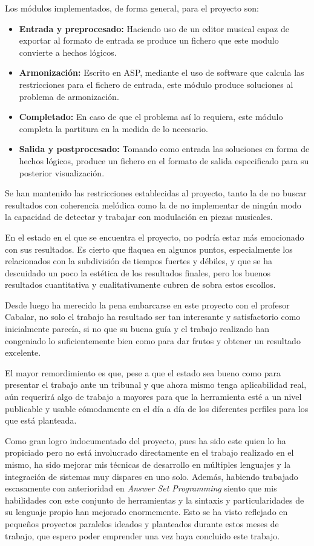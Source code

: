 Los módulos implementados, de forma general, para el proyecto son:
\begin{itemize}
	\item \textbf{Entrada y preprocesado:} Haciendo uso de un editor musical capaz de exportar al formato de entrada se produce un fichero que este modulo convierte a hechos lógicos.
	\item \textbf{Armonización:} Escrito en ASP, mediante el uso de software que calcula las restricciones para el fichero de entrada, este módulo produce soluciones al problema de armonización.
	\item \textbf{Completado:} En caso de que el problema así lo requiera, este módulo completa la partitura en la medida de lo necesario.
	\item \textbf{Salida y postprocesado:} Tomando como entrada las soluciones en forma de hechos lógicos, produce un fichero en el formato de salida especificado para su posterior visualización.
\end{itemize}

Se han mantenido las restricciones establecidas al proyecto, tanto la de no buscar resultados con coherencia melódica como la de no implementar de ningún modo la capacidad de detectar y trabajar con modulación en piezas musicales.

En el estado en el que se encuentra el proyecto, no podría estar más emocionado con sus resultados. Es cierto que flaquea en algunos puntos, especialmente los relacionados con la subdivisión de tiempos fuertes y débiles, y que se ha descuidado un poco la estética de los resultados finales, pero los buenos resultados cuantitativa y cualitativamente cubren de sobra estos escollos.
 
 Desde luego ha merecido la pena embarcarse en este proyecto con el profesor Cabalar, no solo el trabajo ha resultado ser tan interesante y satisfactorio como inicialmente parecía, si no que su buena guía y el trabajo realizado han congeniado lo suficientemente bien como para dar frutos y obtener un resultado excelente.
 
 El mayor remordimiento es que, pese a que el estado sea bueno como para presentar el trabajo ante un tribunal y que ahora mismo tenga aplicabilidad real, aún requerirá algo de trabajo a mayores para que la herramienta esté a un nivel publicable y usable cómodamente en el día a día de los diferentes perfiles para los que está planteada.
 
 Como gran logro indocumentado del proyecto, pues ha sido este quien lo ha propiciado pero no está involucrado directamente en el trabajo realizado en el mismo, ha sido mejorar mis técnicas de desarrollo en múltiples lenguajes y la integración de sistemas muy dispares en uno solo. Además, habiendo trabajado escasamente con anterioridad en \textit{Answer Set Programming} siento que mis habilidades con este conjunto de herramientas y la sintaxis y particularidades de su lenguaje propio han mejorado enormemente. Esto se ha visto reflejado en pequeños proyectos paralelos ideados y planteados durante estos meses de trabajo, que espero poder emprender una vez haya concluido este trabajo.
 
